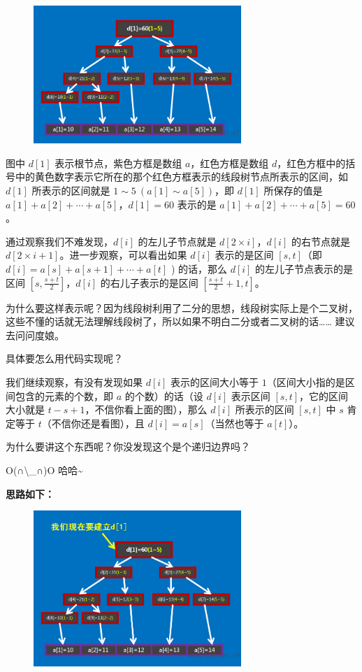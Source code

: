 \begin{figure}[htbp]
\centering
\includegraphics[width=0.7\textwidth]{docs/ds/images/segt1.png} 

\end{figure}

图中 $d[1]$ 表示根节点，紫色方框是数组 $a$，红色方框是数组 $d$，红色方框中的括号中的黄色数字表示它所在的那个红色方框表示的线段树节点所表示的区间，如 $d[1]$ 所表示的区间就是 $1\sim 5\ (a[1]\sim a[5])$，即 $d[1]$ 所保存的值是 $a[1]+a[2]+ \cdots +a[5]$，$d[1]=60$ 表示的是 $a[1]+a[2]+ \cdots +a[5]=60$。

通过观察我们不难发现，$d[i]$ 的左儿子节点就是 $d[2\times i]$，$d[i]$ 的右节点就是 $d[2\times i+1]$。进一步观察，可以看出如果 $d[i]$ 表示的是区间 $[s,t]$（即 $d[i]=a[s]+a[s+1]+ \cdots +a[t]$ ) 的话，那么 $d[i]$ 的左儿子节点表示的是区间 $[s, \frac{s+t}{2} ]$，$d[i]$ 的右儿子表示的是区间 $[ \frac{s+t}{2} +1,t]$。

为什么要这样表示呢？因为线段树利用了二分的思想，线段树实际上是个二叉树，这些不懂的话就无法理解线段树了，所以如果不明白二分或者二叉树的话…… 建议去问问度娘。

具体要怎么用代码实现呢？

我们继续观察，有没有发现如果 $d[i]$ 表示的区间大小等于 $1$（区间大小指的是区间包含的元素的个数，即 $a$ 的个数）的话（设 $d[i]$ 表示区间 $[s,t]$，它的区间大小就是 $t-s+1$，不信你看上面的图），那么 $d[i]$ 所表示的区间 $[s,t]$ 中 $s$ 肯定等于 $t$（不信你还是看图），且 $d[i]=a[s]$（当然也等于 $a[t]$）。

为什么要讲这个东西呢？你没发现这个是个递归边界吗？

O(∩\textbackslash{}\_∩)O 哈哈\textasciitilde{}

\textbf{ 思路如下：}

\begin{figure}[htbp]
\centering
\includegraphics[width=0.7\textwidth]{docs/ds/images/segt2.png} 

\end{figure}

